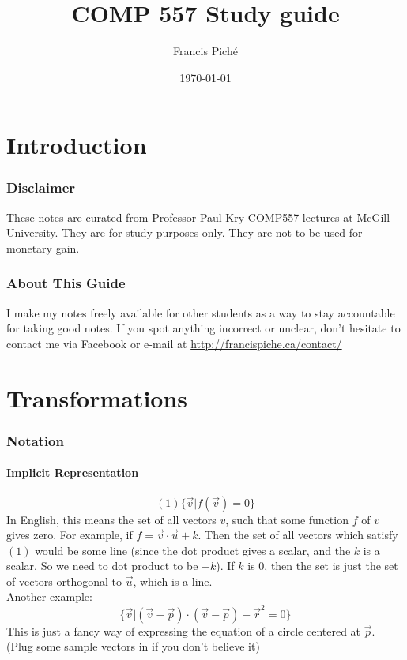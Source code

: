 \documentclass[12pt]{article}
\theoremstyle{definition}
\begin{document}
\title{COMP 557 Study guide}
\author{Francis Pich\'e}
\date{\today}
\maketitle
\newpage
\tableofcontents
\newpage

\part{Introduction}
\section{Disclaimer}
These notes are curated from Professor Paul Kry COMP557 lectures at McGill University. They are for study purposes only. They are not to be used for monetary gain.
\section{About This Guide}
I make my notes freely available for other students as a way to stay accountable for taking good notes. If you spot anything incorrect or unclear, don't hesitate to contact me via Facebook or e-mail at \url{http://francispiche.ca/contact/}
\part{Transformations}
\section{Notation}
\subsection{Implicit Representation}
$$(1)\{\vec{v}|f(\vec{v}) = 0\}$$
In English, this means the set of all vectors $v$, such that some function $f$ of $v$ gives zero. For example, if $f = \vec{v}\cdot\vec{u} + k$. Then the set of all vectors which satisfy $(1)$ would be some line (since the dot product gives a scalar, and the $k$ is a scalar. So we need to dot product to be $-k$). If $k$ is 0, then the set is just the set of vectors orthogonal to $\vec{u}$, which is a line.
\\ \linebreak
Another example: $$\{\vec{v} | (\vec{v} - \vec{p})\cdot(\vec{v} - \vec{p}) - \vec{r}^2 = 0 \}$$
This is just a fancy way of expressing the equation of a circle centered at $\vec{p}$. (Plug some sample vectors in if you don't believe it)
\end{document}
